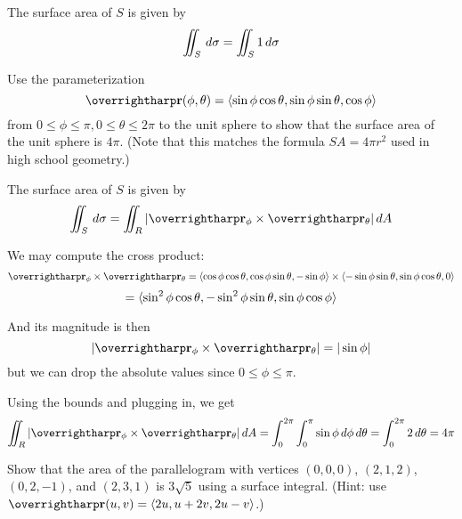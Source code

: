 \documentclass[letterpaper, twoside, 12pt]{book}
\begin{document}
\begin{theorem}
  The surface area of $S$ is given by
  \[
    \iint_S \,d{\sigma} = \iint_S 1\,d{\sigma}
  \]
\end{theorem}

          \begin{problem}
            Use the parameterization
            \[
              \vect{r}(\phi,\theta)
                =
              \<
                \sin\phi\cos\theta,
                \sin\phi\sin\theta,
                \cos\phi
              \>
            \]
            from $0\leq\phi\leq\pi,0\leq\theta\leq2\pi$ to the unit
            sphere to show that the surface area of the unit sphere
            is $4\pi$. (Note that this matches the formula $SA=4\pi r^2$ used
            in high school geometry.)
          \end{problem}

          \begin{solution}
            The surface area of $S$ is given by
            \[
              \iint_S \dvar{\sigma}
                =
              \iint_R |\vect{r}_\phi\times\vect{r}_\theta|\dvar{A}
            \]

            We may compute the cross product:
            \[
              \vect{r}_\phi\times\vect{r}_\theta
                =
              \<\cos\phi\cos\theta,\cos\phi\sin\theta,-\sin\phi\>
                \times
              \<-\sin\phi\sin\theta,\sin\phi\cos\theta,0\>
            \]
            \[
                =
              \langle\sin^2\phi\cos\theta,-\sin^2\phi\sin\theta,\sin\phi\cos\phi\rangle
            \]

            And its magnitude is then
            \[
              |\vect{r}_\phi\times\vect{r}_\theta|
                =
              |\sin\phi|
            \]
            but we can drop the absolute values since $0\leq\phi\leq\pi$.

            Using the bounds and plugging in, we get
            \[
              \iint_R |\vect{r}_\phi\times\vect{r}_\theta|\dvar{A}
                =
              \int_0^{2\pi}\int_0^\pi \sin\phi \dvar{\phi}\dvar{\theta}
                =
              \int_0^{2\pi} 2\dvar{\theta}
                =
              4\pi
            \]
          \end{solution}

          \begin{problem}
            Show that the area of the parallelogram with vertices $(0,0,0)$,
            $(2,1,2)$, $(0,2,-1)$, and $(2,3,1)$ is $3\sqrt{5}$ using a surface
            integral.
            (Hint: use $\vect{r}(u,v)=\<2u,u+2v,2u-v\>$.)
          \end{problem}
\end{document}
